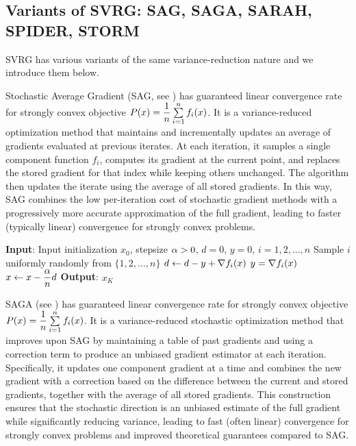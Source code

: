 \subsection{Variants of SVRG: SAG, SAGA, SARAH, SPIDER, STORM}

SVRG has various variants of the same variance-reduction nature and we introduce them below.

Stochastic Average Gradient (SAG, see \cite{SAGpaper}) has guaranteed linear convergence rate for strongly convex objective $P(x)=\dfrac{1}{n}\sum\li_{i=1}^n f_i(x)$. It is a variance-reduced optimization method that maintains and incrementally updates an average of gradients evaluated at previous iterates. At each iteration, it samples a single component function $f_i$, computes its gradient at the current point, and replaces the stored gradient for that index while keeping others unchanged. The algorithm then updates the iterate using the average of all stored gradients. In this way, SAG combines the low per-iteration cost of stochastic gradient methods with a progressively more accurate approximation of the full gradient, leading to faster (typically linear) convergence for strongly convex problems.

\begin{algorithm}[ht]
\caption{Stochastic Average Gradient (SAG): minimizing $P(x)=\dfrac{1}{n}\sum\li_{i=1}^n f_i(x)$}
\label{Alg:SAG}
\begin{algorithmic}[1]
\STATE \textbf{Input}: Input initialization $x_0$, stepsize $\alpha>0$, $d=0$, $y=0$, $i=1,2,...,n$
    \STATE Sample $i$ uniformly randomly from $\{1,2,...,n\}$
    \STATE $d \leftarrow d-y+\nabla f_i(x)$
    \STATE $y=\nabla f_i(x)$
    \STATE $x \leftarrow x-\dfrac{\alpha}{n}d$
\ENDFOR
\STATE \textbf{Output}: $x_K$
\end{algorithmic}
\end{algorithm}


SAGA (see \cite{SAGApaper}) has guaranteed linear convergence rate for strongly convex objective $P(x)=\dfrac{1}{n}\sum\li_{i=1}^n f_i(x)$. It is a variance-reduced stochastic optimization method that improves upon SAG by maintaining a table of past gradients and using a correction term to produce an unbiased gradient estimator at each iteration. Specifically, it updates one component gradient at a time and combines the new gradient with a correction based on the difference between the current and stored gradients, together with the average of all stored gradients. This construction ensures that the stochastic direction is an unbiased estimate of the full gradient while significantly reducing variance, leading to fast (often linear) convergence for strongly convex problems and improved theoretical guarantees compared to SAG.

